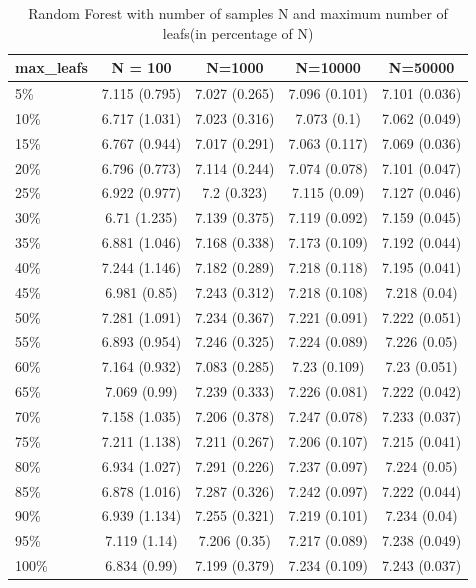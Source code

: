 \documentclass[english,11pt,openany]{report}
\theoremstyle{definition}
\theoremstyle{plain}
\theoremstyle{definition}
\begin{document}
\begin{table}[H]
	\centering
	\caption{Random Forest with number of samples N and maximum number of leafs(in percentage of N)}
	\label{table:rf2}
	\begin{tabular}{|l|c|c|c|c|}\hline
		max\_leafs & N = 100           & N=1000          & N=10000         & N=50000         \\
		\hline
		5\% & 7.115 (0.795) & 7.027 (0.265) & 7.096 (0.101) & 7.101 (0.036) \\ \hline
		10\% &6.717 (1.031) & 7.023 (0.316) & 7.073 (0.1)   & 7.062 (0.049) \\ \hline
		15\% & 6.767 (0.944) & 7.017 (0.291) & 7.063 (0.117) & 7.069 (0.036) \\ \hline
		20\% &6.796 (0.773) & 7.114 (0.244) & 7.074 (0.078) & 7.101 (0.047) \\ \hline
		25\% &6.922 (0.977) & 7.2 (0.323)   & 7.115 (0.09)  & 7.127 (0.046) \\ \hline
		30\% &6.71 (1.235)  & 7.139 (0.375) & 7.119 (0.092) & 7.159 (0.045) \\ \hline
		35\% &6.881 (1.046) & 7.168 (0.338) & 7.173 (0.109) & 7.192 (0.044) \\ \hline
	40\% &	7.244 (1.146) & 7.182 (0.289) & 7.218 (0.118) & 7.195 (0.041) \\\hline
		45\% &6.981 (0.85)  & 7.243 (0.312) & 7.218 (0.108) & 7.218 (0.04)  \\ \hline
	50\% &	7.281 (1.091) & 7.234 (0.367) & 7.221 (0.091) & 7.222 (0.051) \\ \hline
	55\% &	6.893 (0.954) & 7.246 (0.325) & 7.224 (0.089) & 7.226 (0.05)  \\ \hline
	60\% &	7.164 (0.932) & 7.083 (0.285) & 7.23 (0.109)  & 7.23 (0.051)  \\ \hline
	65\% &	7.069 (0.99)  & 7.239 (0.333) & 7.226 (0.081) & 7.222 (0.042) \\ \hline
	70\% &	7.158 (1.035) & 7.206 (0.378) & 7.247 (0.078) & 7.233 (0.037) \\ \hline
	75\% &	7.211 (1.138) & 7.211 (0.267) & 7.206 (0.107) & 7.215 (0.041) \\ \hline
	80\% &	6.934 (1.027) & 7.291 (0.226) & 7.237 (0.097) & 7.224 (0.05)  \\ \hline
	85\% &	6.878 (1.016) & 7.287 (0.326) & 7.242 (0.097) & 7.222 (0.044) \\ \hline
	90\% &	6.939 (1.134) & 7.255 (0.321) & 7.219 (0.101) & 7.234 (0.04)  \\ \hline
	95\% &	7.119 (1.14)  & 7.206 (0.35)  & 7.217 (0.089) & 7.238 (0.049) \\ \hline
	100\% &	6.834 (0.99)  & 7.199 (0.379) & 7.234 (0.109) & 7.243 (0.037) \\ \hline
		\hline

	\end{tabular}
\end{table}
\end{document}
